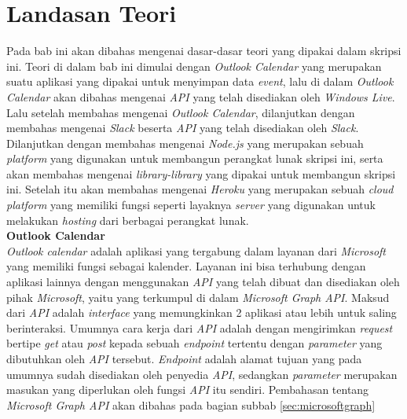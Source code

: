 \chapter{Landasan Teori}
\label{chap:teori}

Pada bab ini akan dibahas mengenai dasar-dasar teori yang dipakai dalam skripsi ini. Teori di dalam bab ini dimulai dengan \textit{Outlook Calendar} yang merupakan suatu aplikasi yang dipakai untuk menyimpan data \textit{event}, lalu di dalam \textit{Outlook Calendar} akan dibahas mengenai \textit{API} yang telah disediakan oleh \textit{Windows Live}. Lalu setelah membahas mengenai \textit{Outlook Calendar}, dilanjutkan dengan membahas mengenai \textit{Slack} beserta \textit{API} yang telah disediakan oleh \textit{Slack}. Dilanjutkan dengan membahas mengenai \textit{Node.js} yang merupakan sebuah \textit{platform} yang digunakan untuk membangun perangkat lunak skripsi ini, serta akan membahas mengenai \textit{library-library} yang dipakai untuk membangun skripsi ini. Setelah itu akan membahas mengenai \textit{Heroku} yang merupakan sebuah \textit{cloud platform} yang memiliki fungsi seperti layaknya \textit{server} yang digunakan untuk melakukan \textit{hosting} dari berbagai perangkat lunak. \\

\textbf{Outlook Calendar}\\
\textit{Outlook calendar} adalah aplikasi yang tergabung dalam layanan dari \textit{Microsoft} yang memiliki fungsi sebagai kalender. Layanan ini bisa terhubung dengan aplikasi lainnya dengan menggunakan \textit{API} yang telah dibuat dan disediakan oleh pihak \textit{Microsoft}, yaitu yang terkumpul di dalam \textit{Microsoft Graph API}. Maksud dari \textit{API} adalah \textit{interface} yang memungkinkan 2 aplikasi atau lebih untuk saling berinteraksi. Umumnya cara kerja dari \textit{API} adalah dengan mengirimkan \textit{request} bertipe \textit{get} atau \textit{post} kepada sebuah \textit{endpoint} tertentu dengan \textit{parameter} yang dibutuhkan oleh \textit{API} tersebut. \textit{Endpoint} adalah alamat tujuan yang pada umumnya sudah disediakan oleh penyedia \textit{API}, sedangkan \textit{parameter} merupakan masukan yang diperlukan oleh fungsi \textit{API} itu sendiri. Pembahasan tentang \textit{Microsoft Graph API} akan dibahas pada bagian subbab \ref{sec:microsoftgraph} 

